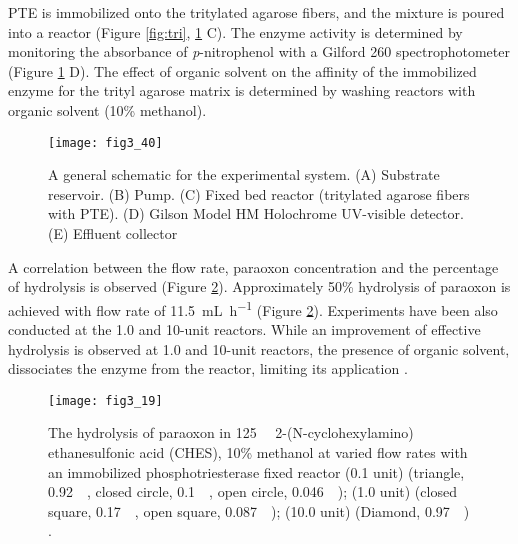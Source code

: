 \begin{refsection}
PTE is immobilized onto the tritylated agarose fibers, and the mixture is
poured into a reactor\cite{Caldwell1991} (Figure \ref{fig:tri}, \ref{fig:pump} C).
The enzyme activity is determined by monitoring the absorbance of
\emph{p}-nitrophenol with a Gilford 260 spectrophotometer (Figure
\ref{fig:pump} D). The effect of organic solvent on the affinity of the
immobilized enzyme for the trityl agarose matrix is determined by washing
reactors with organic solvent (10\% methanol).
\begin{figure}[htbp] \centering \texttt{[image: fig3\_40]}
    \caption[A general schematic for the experimental system. (A) Substrate
        reservoir. (B) Pump. (C) Fixed bed reactor (tritylated agarose fibers
        with PTE). (D) Gilson Model HM Holochrome UV-visible detector. (E)
        Effluent
collector]{A general schematic for the experimental system. (A) Substrate
    reservoir. (B) Pump. (C) Fixed bed reactor (tritylated agarose fibers with
    PTE). (D) Gilson Model HM Holochrome UV-visible detector. (E) Effluent
collector} \label{fig:pump}
\end{figure}

A correlation between the flow rate, paraoxon concentration
and the percentage of hydrolysis is observed (Figure \ref{fig:pte-app-imm}).
Approximately 50\% hydrolysis of paraoxon is achieved with flow rate of
\SI{11.5}{\mL\per\hour} (Figure \ref{fig:pte-app-imm}). Experiments have been
also conducted at the 1.0 and 10-unit reactors. While an improvement of
effective hydrolysis is observed at 1.0 and 10-unit reactors, the presence of
organic solvent, dissociates the enzyme from the reactor, limiting its
application \cite{Cashion1982}.
\begin{figure}[htbp] \centering \texttt{[image: fig3\_19]}
    \caption[The hydrolysis of paraoxon in \SI{125}{\milli\Molar}
        2-(N-cyclohexylamino)ethanesulfonic acid (CHES), 10\% methanol at
    varied flow rates with an immobilized phosphotriesterase fixed reactor (0.1
unit) (triangle, \SI{0.92}{\milli\Molar}, closed circle,
\SI{0.1}{\milli\Molar}, open circle, \SI{0.046}{\milli\Molar}); (1.0 unit)
(closed square, \SI{0.17}{\milli\Molar}, open square,
\SI{0.087}{\milli\Molar}); (10.0 unit) (Diamond, \SI{0.97}{\milli\Molar}).]{The
    hydrolysis of paraoxon in \SI{125}{\milli\Molar} 2-(N-cyclohexylamino)
    ethanesulfonic acid (CHES), 10\% methanol at varied flow rates with an
    immobilized phosphotriesterase fixed reactor (0.1 unit) (triangle,
    \SI{0.92}{\milli\Molar}, closed circle, \SI{0.1}{\milli\Molar}, open
    circle, \SI{0.046}{\milli\Molar}); (1.0 unit) (closed square,
    \SI{0.17}{\milli\Molar}, open square, \SI{0.087}{\milli\Molar}); (10.0
    unit) (Diamond, \SI{0.97}{\milli\Molar}) \cite{Caldwell1991}.}
    \label{fig:pte-app-imm}
\end{figure}


\end{refsection}
